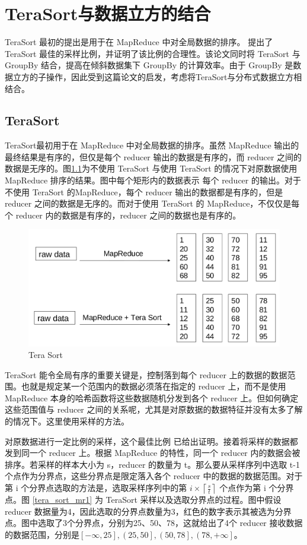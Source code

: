 \chapter{TeraSort与数据立方的结合}

TeraSort \cite{o2008terabyte} 最初的提出是用于在 MapReduce 中对全局数据的排序。\cite{tao2013minimal} 提出了 TeraSort 最佳的采样比例，并证明了该比例的合理性。该论文同时将 TeraSort 与 GroupBy 结合，提高在倾斜数据集下 GroupBy 的计算效率。由于 GroupBy 是数据立方的子操作，因此受到这篇论文的启发，考虑将TeraSort与分布式数据立方相结合。

\section{TeraSort}

TeraSort最初用于在 MapReduce 中对全局数据的排序。虽然 MapReduce 输出的最终结果是有序的，但仅是每个 reducer 输出的数据是有序的，而 reducer 之间的数据是无序的。图\ref{tera_sort}为不使用 TeraSort 与使用 TeraSort 的情况下对原数据使用 MapReduce 排序的结果。图中每个矩形内的数据表示 每个 reducer 的输出。对于不使用 TeraSort 的MapReduce，每个 reducer 输出的数据都是有序的，但是reducer 之间的数据是无序的。而对于使用 TeraSort 的 MapReduce，不仅仅是每个 reducer 内的数据是有序的，reducer 之间的数据也是有序的。

\begin{figure}[ht] 
\centering\includegraphics[width=4.5in]{picture/ch_terasort_mr/tera_sort} 
\caption{Tera Sort}\label{tera_sort} 
\end{figure}

TeraSort 能令全局有序的重要关键是，控制落到每个 reducer 上的数据的数据范围。也就是规定某一个范围内的数据必须落在指定的 reducer 上，而不是使用 MapReduce 本身的哈希函数将这些数据随机分发到各个 reducer 上。但如何确定这些范围值与 reducer 之间的关系呢，尤其是对原数据的数据特征并没有太多了解的情况下。这里使用采样的方法。

对原数据进行一定比例的采样，这个最佳比例 \cite{tao2013minimal} 已给出证明。接着将采样的数据都发到同一个 reducer 上。根据 MapReduce 的特性，同一个 reducer 内的数据会被排序。若采样的样本大小为 s，reducer 的数量为 t。那么要从采样序列中选取 t-1 个点作为分界点，这些分界点是限定落入各个 reducer 中的数据的数据范围。对于第 i 个分界点选取的方法是，选取采样序列中的第 $i\times \left \lceil \frac{s}{t} \right \rceil$ 个点作为第 i 个分界点。图 \ref{tera_sort_mr1} 为  TeraSort 采样以及选取分界点的过程。图中假设 reducer 数据量为4，因此选取的分界点数量为3，红色的数字表示其被选为分界点。图中选取了3个分界点，分别为25、50、78，这就给出了4个 reducer 接收数据的数据范围，分别是$\left[- \infty, 25 \right], \left(25, 50 \right], \left(50, 78 \right], \left(78, +\infty \right]$。

